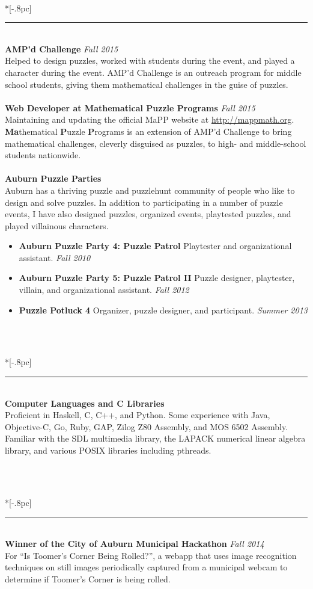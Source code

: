 \documentclass{article}
\begin{document}
 \\*[-.8pc]
\rule{\textwidth}{.1pt} \\
\textbf{AMP'd Challenge} \hfill \textit{Fall 2015}\\
Helped to design puzzles, worked with students during the event, and played a
character during the event. AMP'd Challenge is an outreach program for middle
school students, giving them
mathematical challenges in the guise of puzzles.  \\
\\
\textbf{Web Developer at Mathematical Puzzle Programs} \hfill \textit{Fall 2015}\\
Maintaining and updating the official MaPP website at
\url{http://mappmath.org}. \textbf{Ma}thematical \textbf{P}uzzle \textbf{P}rograms
is an extension of AMP'd Challenge to bring mathematical challenges, cleverly
disguised as puzzles, to high- and middle-school students nationwide.\\
\\
\textbf{Auburn Puzzle Parties}\\
Auburn has a thriving puzzle and puzzlehunt community of people who like to
design and solve puzzles. In addition to participating in a number of puzzle
events, I have also designed puzzles, organized events, playtested puzzles, and
played villainous characters.
\begin{itemize}[noitemsep]
\item \textbf{Auburn Puzzle Party 4: Puzzle Patrol} Playtester and
  organizational assistant. \hfill \textit{Fall 2010}
\item \textbf{Auburn Puzzle Party 5: Puzzle Patrol II} Puzzle designer,
  playtester, villain, and organizational assistant. \hfill \textit{Fall 2012}
\item \textbf{Puzzle Potluck 4} Organizer, puzzle designer, and
  participant. \hfill \textit{Summer 2013}
\end{itemize}

\

 \\*[-.8pc]
\rule{\textwidth}{.1pt} \\
{\bf Computer Languages and C Libraries} \\
Proficient in Haskell, C, C++, and Python. Some experience with Java,
Objective-C, Go, Ruby, GAP, Zilog Z80 Assembly, and MOS 6502 Assembly. Familiar
with the SDL multimedia library, the LAPACK numerical linear algebra library,
and various POSIX libraries including pthreads.

\

 \\*[-.8pc]
\rule{\textwidth}{.1pt} \\
{\bf Winner of the City of Auburn Municipal Hackathon} \hfill {\it Fall 2014}\\
For ``Is Toomer's Corner Being Rolled?'', a webapp that uses image recognition
techniques on still images periodically captured from a municipal webcam to determine
if Toomer's Corner is being rolled.
\\ \\

\end{document}
